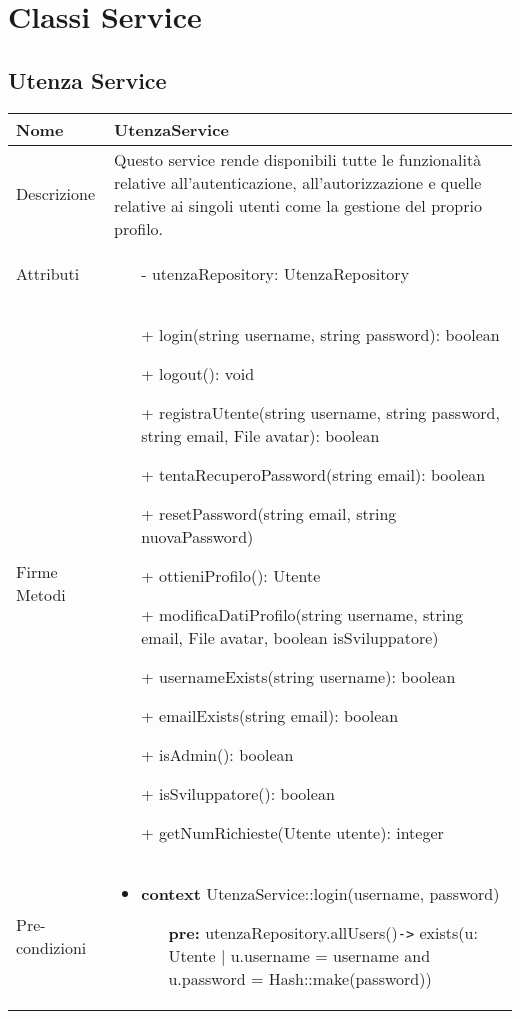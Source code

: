 \newpage
\section{Classi Service}
\subsection{Utenza Service}
\small\begin{tabular}{|| l | p{34em} ||} 
	\hline
	Nome & UtenzaService\\
	\hline
	Descrizione & Questo service rende disponibili tutte le funzionalità relative all'autenticazione, all'autorizzazione e quelle relative ai singoli utenti come la gestione del proprio profilo. \\
	\hline
	Attributi & \begin{itemize}
		\item[-] utenzaRepository: UtenzaRepository
	\end{itemize}\\
	\hline
	Firme Metodi & \begin{itemize}
		\item[+] login(string username, string password): boolean
		\item[+] logout(): void
		\item[+] registraUtente(string username, string password, string email, File avatar): boolean
		\item[+] tentaRecuperoPassword(string email): boolean
		\item[+] resetPassword(string email, string nuovaPassword)
		\item[+] ottieniProfilo(): Utente
		\item[+] modificaDatiProfilo(string username, string email, File avatar, boolean isSviluppatore)
		\item[+] usernameExists(string username): boolean
		\item[+] emailExists(string email): boolean
		\item[+] isAdmin(): boolean 
		\item[+] isSviluppatore(): boolean 
		\item[+] getNumRichieste(Utente utente): integer 
	\end{itemize}\\
	\hline
Pre-condizioni & \begin{itemize}[leftmargin=*]
	\item \textbf{context} UtenzaService::login(username, password)
	\begin{itemize}
		\item[ ] \textbf{pre:} utenzaRepository.allUsers()\verb|->| exists(u: Utente | u.username = username and u.password = Hash::make(password))
	\end{itemize}


\end{itemize}
\end{tabular}
